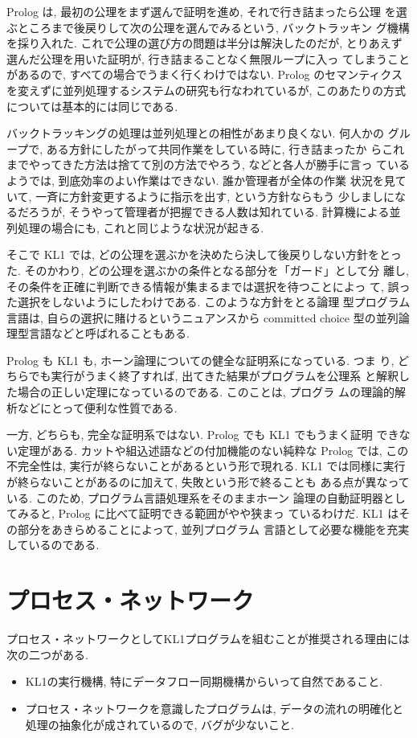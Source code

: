 \documentclass[a4,titlepage]{jsreport}
\begin{document}
Prolog は, 最初の公理をまず選んで証明を進め, それで行き詰まったら公理
を選ぶところまで後戻りして次の公理を選んでみるという, バックトラッキン
グ機構を採り入れた.  これで公理の選び方の問題は半分は解決したのだが, 
とりあえず選んだ公理を用いた証明が, 行き詰まることなく無限ループに入っ
てしまうことがあるので, すべての場合でうまく行くわけではない.  Prolog 
のセマンティクスを変えずに並列処理するシステムの研究も行なわれているが, 
このあたりの方式については基本的には同じである.

バックトラッキングの処理は並列処理との相性があまり良くない.  何人かの
グループで, ある方針にしたがって共同作業をしている時に, 行き詰まったか
らこれまでやってきた方法は捨てて別の方法でやろう, などと各人が勝手に言っ
ているようでは, 到底効率のよい作業はできない.  誰か管理者が全体の作業
状況を見ていて, 一斉に方針変更するように指示を出す, という方針ならもう
少しましになるだろうが, そうやって管理者が把握できる人数は知れている.
計算機による並列処理の場合にも, これと同じような状況が起きる.

そこで KL1 では, どの公理を選ぶかを決めたら決して後戻りしない方針をとっ
た.  そのかわり, どの公理を選ぶかの条件となる部分を「ガード」として分
離し, その条件を正確に判断できる情報が集まるまでは選択を待つことによっ
て, 誤った選択をしないようにしたわけである.  このような方針をとる論理
型プログラム言語は, 自らの選択に賭けるというニュアンスから committed
choice 型の並列論理型言語などと呼ばれることもある.

Prolog も KL1 も, ホーン論理についての健全な証明系になっている.  つま
り, どちらでも実行がうまく終了すれば, 出てきた結果がプログラムを公理系
と解釈した場合の正しい定理になっているのである.  このことは, プログラ
ムの理論的解析などにとって便利な性質である.

一方, どちらも, 完全な証明系ではない.  Prolog でも KL1 でもうまく証明
できない定理がある.  カットや組込述語などの付加機能のない純粋な Prolog 
では, この不完全性は, 実行が終らないことがあるという形で現れる.  KL1 
では同様に実行が終らないことがあるのに加えて, 失敗という形で終ることも
ある点が異なっている.  このため, プログラム言語処理系をそのままホーン
論理の自動証明器としてみると, Prolog に比べて証明できる範囲がやや狭まっ
ているわけだ.  KL1 はその部分をあきらめることによって, 並列プログラム
言語として必要な機能を充実しているのである.

\chapter{プロセス・ネットワーク}

プロセス・ネットワークとしてKL1プログラムを組むことが推奨される理由には
次の二つがある.  
\begin{itemize}
\item KL1の実行機構, 特にデータフロー同期機構からいって自然であること.  
\item プロセス・ネットワークを意識したプログラムは, 
データの流れの明確化と処理の抽象化が成されているので, 
バグが少ないこと.
\end{itemize}
\end{document}
